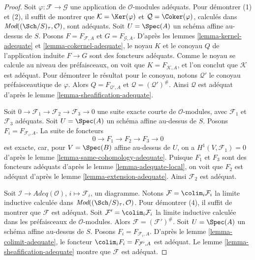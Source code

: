 \begin{proof}
Soit $\varphi : \mathcal{F} \to \mathcal{G}$ une application de
$\mathcal{O}$-modules adéquats. Pour démontrer (1) et (2), il suffit de montrer que
$\mathcal{K} = \Ker(\varphi)$ et
$\mathcal{Q} = \Coker(\varphi)$, calculés dans
$\textit{Mod}((\Sch/S)_\tau, \mathcal{O})$, sont adéquats.
Soit $U = \Spec(A)$ un schéma affine au-dessus de $S$.
Posons $F = F_{\mathcal{F}, A}$ et $G = F_{\mathcal{G}, A}$.
D'après les
lemmes \ref{lemma-kernel-adequate} et
\ref{lemma-cokernel-adequate},
le noyau $K$ et le conoyau $Q$ de l'application induite
$F \to G$ sont des foncteurs adéquats.
Comme le noyau se calcule au niveau des préfaisceaux, on voit
que $K = F_{\mathcal{K}, A}$, et l'on conclut que $\mathcal{K}$ est adéquat.
Pour démontrer le résultat pour le conoyau, notons $\mathcal{Q}'$ le conoyau
préfaisceautique de $\varphi$. Alors $Q = F_{\mathcal{Q}', A}$ et
$\mathcal{Q} = (\mathcal{Q}')^\#$. Ainsi $\mathcal{Q}$
est adéquat d'après le
lemme \ref{lemma-sheafification-adequate}.

\medskip\noindent
Soit $0 \to \mathcal{F}_1 \to \mathcal{F}_2 \to \mathcal{F}_3 \to 0$
une suite exacte courte de $\mathcal{O}$-modules, avec
$\mathcal{F}_1$ et $\mathcal{F}_3$ adéquats.
Soit $U = \Spec(A)$ un schéma affine au-dessus de $S$.
Posons $F_i = F_{\mathcal{F}_i, A}$. La suite de foncteurs
$$
0 \to F_1 \to F_2 \to F_3 \to 0
$$
est exacte, car, pour $V = \Spec(B)$ affine au-dessus de $U$, on a
$H^1(V, \mathcal{F}_1) = 0$ d'après le
lemme \ref{lemma-same-cohomology-adequate}.
Puisque $F_1$ et $F_3$ sont des foncteurs adéquats d'après le
lemme \ref{lemma-adequate-local},
on voit que $F_2$ est adéquat d'après le
lemme \ref{lemma-extension-adequate}.
Ainsi $\mathcal{F}_2$ est adéquat.

\medskip\noindent
Soit $\mathcal{I} \to \textit{Adeq}(\mathcal{O})$, $i \mapsto \mathcal{F}_i$,
un diagramme. Notons $\mathcal{F} = \colim_i \mathcal{F}_i$
la limite inductive calculée dans
$\textit{Mod}((\Sch/S)_\tau, \mathcal{O})$.
Pour démontrer (4), il suffit de montrer que $\mathcal{F}$ est adéquat.
Soit $\mathcal{F}' = \colim_i \mathcal{F}_i$ la limite inductive calculée
dans les préfaisceaux de $\mathcal{O}$-modules. Alors
$\mathcal{F} = (\mathcal{F}')^\#$.
Soit $U = \Spec(A)$ un schéma affine au-dessus de $S$.
Posons $F_i = F_{\mathcal{F}_i, A}$. D'après le
lemme \ref{lemma-colimit-adequate},
le foncteur $\colim_i F_i = F_{\mathcal{F}', A}$ est adéquat.
Le lemme \ref{lemma-sheafification-adequate}
montre que $\mathcal{F}$ est adéquat.
\end{proof}

